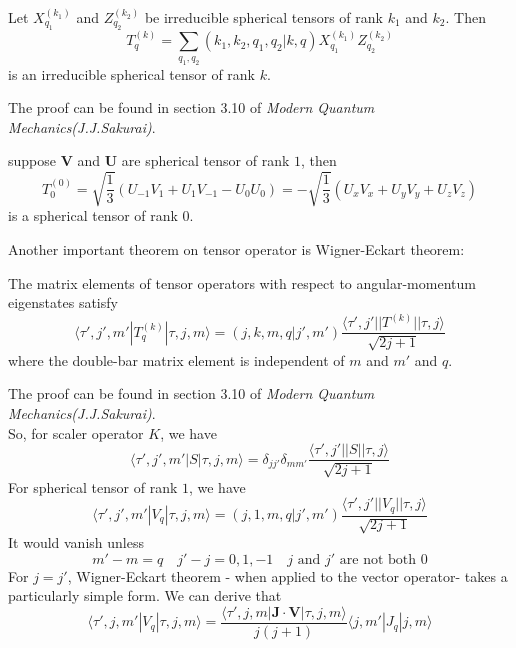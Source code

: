 \begin{newthem}
Let $X^{(k_1)}_{q_1}$ and $Z^{(k_2)}_{q_2}$ be irreducible spherical tensors of rank $k_1$ and $k_2$. Then
\[T^{(k)}_{q} = \sum_{q_1,q_2} (k_1,k_2,q_1,q_2|k,q) X^{(k_1)}_{q_1} Z^{(k_2)}_{q_2}\]
is an irreducible spherical tensor of rank $k$. 
\end{newthem}
\noindent
The proof can be found in section 3.10 of \emph{Modern Quantum Mechanics(J.J.Sakurai)}.

\begin{example}
suppose $\bm{V}$ and $\bm{U}$ are spherical tensor of rank $1$, then
\[T^{(0)}_{0} = \sqrt{\frac{1}{3}} (U_{-1}V_{1} + U_{1}V_{-1}-U_{0}U_{0}) = - \sqrt{\frac{1}{3}} (U_xV_x + U_yV_y + U_zV_z)\]
is a spherical tensor of rank $0$.
\end{example}

\noindent
Another important theorem on tensor operator is Wigner-Eckart theorem:\\

\begin{newthem}
The matrix elements of tensor operators with respect to angular-momentum eigenstates satisfy
\[\langle \tau',j',m'| T^{(k)}_{q}| \tau,j,m\rangle = (j,k,m,q|j',m') \frac{\langle \tau',j' || T^{(k)} || \tau,j\rangle}{\sqrt{2j+1}}\]
where the double-bar matrix element is independent of $m$ and $m'$ and $q$.
\end{newthem}

\noindent
The proof can be found in section 3.10 of \emph{Modern Quantum Mechanics(J.J.Sakurai)}.\\
So, for scaler operator $K$, we have
\[\langle \tau',j',m'| S| \tau,j,m\rangle = \delta_{jj'}\delta_{mm'} \frac{\langle \tau',j' || S || \tau,j\rangle}{\sqrt{2j+1}}\]
For spherical tensor of rank $1$, we have
\[\langle \tau',j',m'| V_{q} | \tau,j,m\rangle = (j,1,m,q|j',m') \frac{\langle \tau',j' || V_q || \tau,j\rangle}{\sqrt{2j+1}}\]
It would vanish unless
\[m'-m = q \quad j'-j = 0,1,-1 \quad j \mbox{ and } j' \mbox{ are not both  } 0\]
For $j=j'$, Wigner-Eckart theorem - when applied to the vector operator- takes a particularly simple form. We can derive that
\[\langle \tau',j,m' | V_q | \tau, j ,m \rangle = \frac{\langle \tau',j,m | \bm{J}\cdot\bm{V} | \tau, j ,m \rangle}{j(j+1)} \langle j,m' | J_q | j ,m \rangle\]

